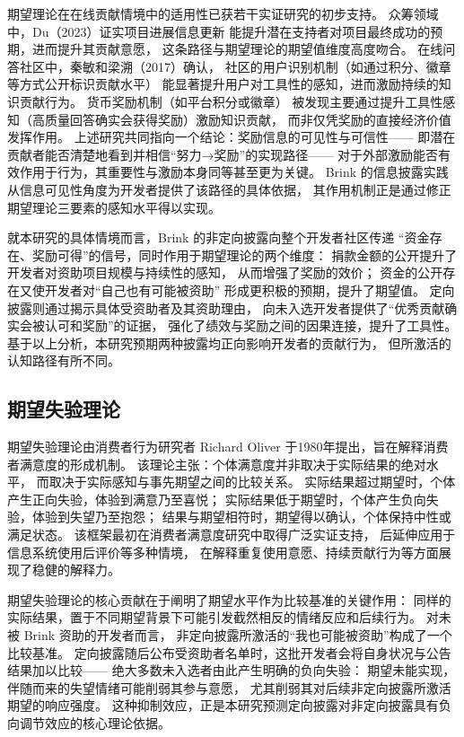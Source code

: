 期望理论在在线贡献情境中的适用性已获若干实证研究的初步支持。
众筹领域中，Du（2023）证实项目进展信息更新
能提升潜在支持者对项目最终成功的预期，进而提升其贡献意愿，
这条路径与期望理论的期望值维度高度吻合\cite{du2023impact}。
在线问答社区中，秦敏和梁溯（2017）确认，
社区的用户识别机制（如通过积分、徽章等方式公开标识贡献水平）
能显著提升用户对工具性的感知，进而激励持续的知识贡献行为\cite{qin2017user}。
货币奖励机制（如平台积分或徽章）
被发现主要通过提升工具性感知（高质量回答确实会获得奖励）激励知识贡献，
而非仅凭奖励的直接经济价值发挥作用。
上述研究共同指向一个结论：奖励信息的可见性与可信性——
即潜在贡献者能否清楚地看到并相信“努力→奖励”的实现路径——
对于外部激励能否有效作用于行为，其重要性与激励本身同等甚至更为关键。
Brink 的信息披露实践从信息可见性角度为开发者提供了该路径的具体依据，
其作用机制正是通过修正期望理论三要素的感知水平得以实现。

就本研究的具体情境而言，Brink 的非定向披露向整个开发者社区传递
“资金存在、奖励可得”的信号，同时作用于期望理论的两个维度：
捐款金额的公开提升了开发者对资助项目规模与持续性的感知，
从而增强了奖励的效价；
资金的公开存在又使开发者对“自己也有可能被资助”
形成更积极的预期，提升了期望值。
定向披露则通过揭示具体受资助者及其资助理由，
向未入选开发者提供了“优秀贡献确实会被认可和奖励”的证据，
强化了绩效与奖励之间的因果连接，提升了工具性。
基于以上分析，本研究预期两种披露均正向影响开发者的贡献行为，
但所激活的认知路径有所不同。

\subsection{期望失验理论}

期望失验理论由消费者行为研究者
Richard Oliver 于1980年提出，旨在解释消费者满意度的形成机制\cite{oliver1980cognitive}。
该理论主张：个体满意度并非取决于实际结果的绝对水平，
而取决于实际感知与事先期望之间的比较关系。
实际结果超过期望时，个体产生正向失验，体验到满意乃至喜悦；
实际结果低于期望时，个体产生负向失验，体验到失望乃至抱怨；
结果与期望相符时，期望得以确认，个体保持中性或满足状态。
该框架最初在消费者满意度研究中取得广泛实证支持，
后延伸应用于信息系统使用后评价\cite{abrate2021relationship}等多种情境，
在解释重复使用意愿、持续贡献行为等方面展现了稳健的解释力。

期望失验理论的核心贡献在于阐明了期望水平作为比较基准的关键作用：
同样的实际结果，置于不同期望背景下可能引发截然相反的情绪反应和后续行为。
对未被 Brink 资助的开发者而言，
非定向披露所激活的“我也可能被资助”构成了一个比较基准。
定向披露随后公布受资助者名单时，这批开发者会将自身状况与公告结果加以比较——
绝大多数未入选者由此产生明确的负向失验：
期望未能实现，伴随而来的失望情绪可能削弱其参与意愿，
尤其削弱其对后续非定向披露所激活期望的响应强度。
这种抑制效应，正是本研究预测定向披露对非定向披露具有负向调节效应的核心理论依据。

